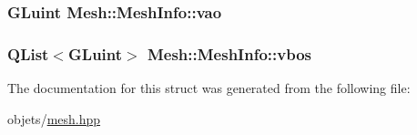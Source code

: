 \hypertarget{struct_mesh_1_1_mesh_info_af15096e0f0aa61fff7d8a1c223e547cf}{
\subsubsection[{vao}]{\setlength{\rightskip}{0pt plus 5cm}G\+Luint Mesh\+::\+Mesh\+Info\+::vao}}\label{struct_mesh_1_1_mesh_info_af15096e0f0aa61fff7d8a1c223e547cf}
\hypertarget{struct_mesh_1_1_mesh_info_ad360b326ff7424dc9b6a3f6614af895d}{
\subsubsection[{vbos}]{\setlength{\rightskip}{0pt plus 5cm}Q\+List$<$G\+Luint$>$ Mesh\+::\+Mesh\+Info\+::vbos}}\label{struct_mesh_1_1_mesh_info_ad360b326ff7424dc9b6a3f6614af895d}


The documentation for this struct was generated from the following file\+:\begin{DoxyCompactItemize}
\item 
objets/\hyperlink{mesh_8hpp}{mesh.\+hpp}\end{DoxyCompactItemize}
